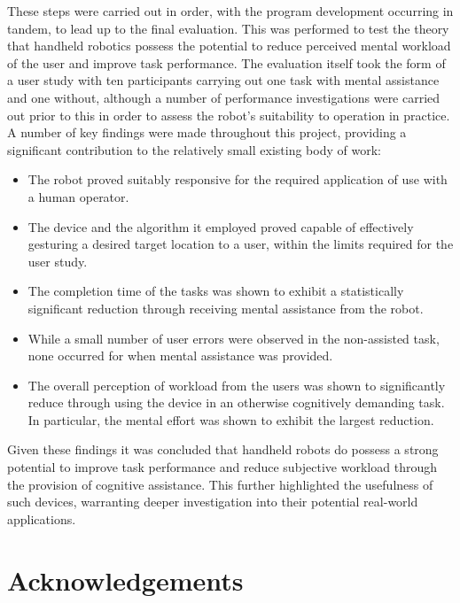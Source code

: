 \documentclass[11pt]{article}
\begin{document}
These steps were carried out in order, with the program development occurring in tandem, to lead up to the final evaluation. This was performed to test the theory that handheld robotics possess the potential to reduce perceived mental workload of the user and improve task performance. The evaluation itself took the form of a user study with ten participants carrying out one task with mental assistance and one without, although a number of performance investigations were carried out prior to this in order to assess the robot's suitability to operation in practice. A number of key findings were made throughout this project, providing a significant contribution to the relatively small existing body of work:
\begin{itemize}
\item{The robot proved suitably responsive for the required application of use with a human operator.}
\item{The device and the algorithm it employed proved capable of effectively gesturing a desired target location to a user, within the limits required for the user study.}
\item{The completion time of the tasks was shown to exhibit a statistically significant reduction through receiving mental assistance from the robot.}
\item{While a small number of user errors were observed in the non-assisted task, none occurred for when mental assistance was provided.}
\item{The overall perception of workload from the users was shown to significantly reduce through using the device in an otherwise cognitively demanding task. In particular, the mental effort was shown to exhibit the largest reduction.}
\end{itemize}

Given these findings it was concluded that handheld robots do possess a strong potential to improve task performance and reduce subjective workload through the provision of cognitive assistance. This further highlighted the usefulness of such devices, warranting deeper investigation into their potential real-world applications. 

\pagebreak

\section*{Acknowledgements}
\pagebreak

\renewcommand{\thepage}{\arabic{page}}%
\end{document}
